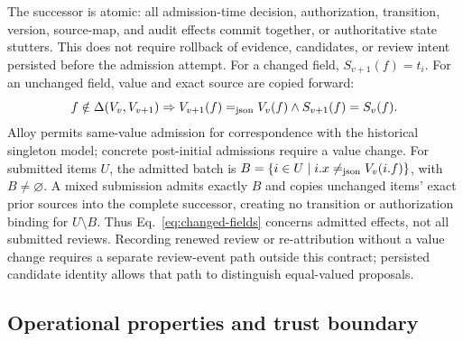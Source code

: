 The successor is atomic: all admission-time decision, authorization, transition, version, source-map, and audit effects commit together, or authoritative state stutters. This does not require rollback of evidence, candidates, or review intent persisted before the admission attempt. For a changed field, $S_{v+1}(f)=t_i$. For an unchanged field, value and exact source are copied forward:
\begin{equation}
f\notin\Delta(V_v,V_{v+1})\Rightarrow
V_{v+1}(f)\mathrel{=_{\mathrm{json}}} V_v(f)\land S_{v+1}(f)=S_v(f).
\label{eq:copy-forward}
\end{equation}
Alloy permits same-value admission for correspondence with the historical singleton model; concrete post-initial admissions require a value change. For submitted items $U$, the admitted batch is $B=\{i\in U\mid i.x\mathrel{\neq_{\mathrm{json}}} V_v(i.f)\}$, with $B\neq\varnothing$. A mixed submission admits exactly $B$ and copies unchanged items' exact prior sources into the complete successor, creating no transition or authorization binding for $U\setminus B$. Thus Eq.~\eqref{eq:changed-fields} concerns admitted effects, not all submitted reviews. Recording renewed review or re-attribution without a value change requires a separate review-event path outside this contract; persisted candidate identity allows that path to distinguish equal-valued proposals.

\subsection{Operational properties and trust boundary}

